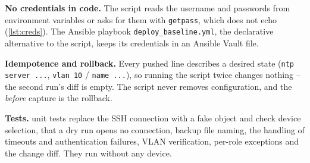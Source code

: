 
\textbf{No credentials in code.} The script reads the username and passwords from environment variables or
asks for them with \texttt{getpass}, which does not echo (\cref{lst:creds}). The Ansible playbook
\texttt{deploy\_baseline.yml}, the declarative alternative to the script, keeps its credentials in an Ansible
Vault file. 


\textbf{Idempotence and rollback.} Every pushed line describes a desired state (\texttt{ntp server ...},
\texttt{vlan 10} / \texttt{name ...}), so running the script twice changes nothing -- the second run's diff is
empty. The script never removes configuration, and the \emph{before} capture is the rollback.

\textbf{Tests.} \FactTestsAutomation{} unit tests replace the SSH connection with a fake object and check
device selection, that a dry run opens no connection, backup file naming, the handling of timeouts and
authentication failures, VLAN verification, per-role exceptions and the change diff. They run without any
device.


